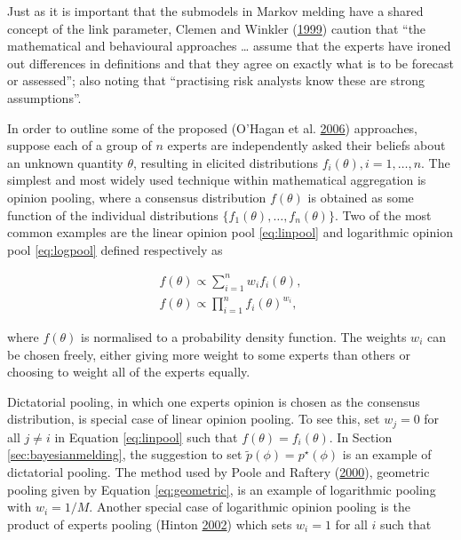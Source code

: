 \documentclass[11pt,]{book}
\begin{document}
Just as it is important that the submodels in Markov melding have a
shared concept of the link parameter, Clemen and Winkler
(\protect\hyperlink{ref-clemen1999combining}{1999}) caution that ``the
mathematical and behavioural approaches \ldots{} assume that the experts
have ironed out differences in definitions and that they agree on
exactly what is to be forecast or assessed''; also noting that
``practising risk analysts know these are strong assumptions''.

In order to outline some of the proposed (O'Hagan et al.
\protect\hyperlink{ref-o2006uncertain}{2006}) approaches, suppose each
of a group of \(n\) experts are independently asked their beliefs about
an unknown quantity \(\theta\), resulting in elicited distributions
\(f_i(\theta), i = 1, \ldots, n\). The simplest and most widely used
technique within mathematical aggregation is opinion pooling, where a
consensus distribution \(f(\theta)\) is obtained as some function of the
individual distributions \(\{f_1(\theta), \ldots, f_n(\theta)\}\). Two
of the most common examples are the linear opinion pool
\eqref{eq:linpool} and logarithmic opinion pool \eqref{eq:logpool}
defined respectively as

\begin{align}
f(\theta) \propto \sum_{i=1}^{n} w_i f_i(\theta) \label{eq:linpool}, \\ 
f(\theta) \propto \prod_{i=1}^{n} f_i(\theta)^{w_i} \label{eq:logpool},
\end{align}

where \(f(\theta)\) is normalised to a probability density function. The
weights \(w_i\) can be chosen freely, either giving more weight to some
experts than others or choosing to weight all of the experts equally.

Dictatorial pooling, in which one experts opinion is chosen as the
consensus distribution, is special case of linear opinion pooling. To
see this, set \(w_j = 0\) for all \(j \neq i\) in Equation
\eqref{eq:linpool} such that \(f(\theta) = f_i(\theta)\). In Section
\ref{sec:bayesianmelding}, the suggestion to set
\(\tilde p(\phi) = p^\star(\phi)\) is an example of dictatorial pooling.
The method used by Poole and Raftery
(\protect\hyperlink{ref-poole2000inference}{2000}), geometric pooling
given by Equation \eqref{eq:geometric}, is an example of logarithmic
pooling with \(w_i = 1/M\). Another special case of logarithmic opinion
pooling is the product of experts pooling (Hinton
\protect\hyperlink{ref-hinton2002training}{2002}) which sets \(w_i = 1\)
for all \(i\) such that
\end{document}
